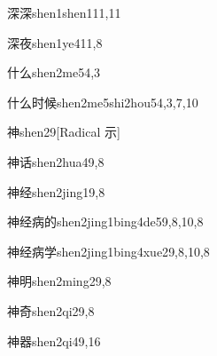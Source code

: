 \begin{verbete}{深深}{shen1shen1}{11,11}
\end{verbete}

\begin{verbete}{深夜}{shen1ye4}{11,8}
\end{verbete}

\begin{verbete}{什么}{shen2me5}{4,3}
\end{verbete}

\begin{verbete}{什么时候}{shen2me5shi2hou5}{4,3,7,10}
\end{verbete}

\begin{verbete}{神}{shen2}{9}[Radical 示]
\end{verbete}

\begin{verbete}{神话}{shen2hua4}{9,8}
\end{verbete}

\begin{verbete}{神经}{shen2jing1}{9,8}
\end{verbete}

\begin{verbete}{神经病的}{shen2jing1bing4de5}{9,8,10,8}
\end{verbete}

\begin{verbete}{神经病学}{shen2jing1bing4xue2}{9,8,10,8}
\end{verbete}

\begin{verbete}{神明}{shen2ming2}{9,8}
\end{verbete}

\begin{verbete}{神奇}{shen2qi2}{9,8}
\end{verbete}

\begin{verbete}{神器}{shen2qi4}{9,16}
\end{verbete}

